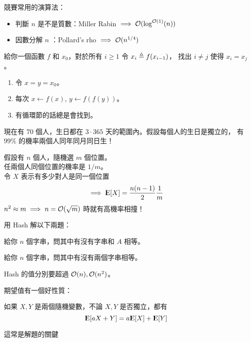 \documentclass[standalone]{beamer}
\begin{document}
\begin{frame}
  競賽常用的演算法：\pause
  \begin{itemize}
    \item 判斷 $n$ 是不是質數：Miller Rabin $ \implies \mathcal{O}(\log^{\mathcal{O}(1)}(n))$
    \item 因數分解 $n$ ：Pollard's rho $ \implies \mathcal{O}(n^{1/4})$
  \end{itemize}
\end{frame}

\begin{frame}{}
  \begin{problem}[找循環節]
    給你一個函數 $f$ 和 $x_0$，對於所有 $i \geq 1$ 令 $x_i \triangleq f(x_{i-1})$，
    找出 $i \neq j$ 使得 $x_i = x_j$。
  \end{problem}
  \pause

  \begin{enumerate}[<+->]
    \item 令 $x = y = x_0$。
    \item 每次 $x \gets f(x)$, $y \gets f(f(y))$。
    \item 有循環節的話總是會找到。
  \end{enumerate}
\end{frame}

\begin{frame}{}
  現在有 $70$ 個人，生日都在 $3 \cdot 365$ 天的範圍內。假設每個人的生日是獨立的，
  有 $99\%$ 的機率兩個人同年同月同日生！ \pause

  假設有 $n$ 個人，隨機選 $m$ 個位置。\\ \pause
  任兩個人同個位置的機率是 $1 / m$。 \\ \pause
  令 $X$ 表示有多少對人是同一個位置
  \[ \implies {\rm I\kern-.3em E}[X] = \frac{n(n-1)}{2} \frac{1}{m} \]
  \pause
  $n^2 \approx m \implies n = \mathcal{O}(\sqrt{m})$ 時就有高機率相撞！
\end{frame}

\begin{frame}{}
  用 Hash 解以下兩題：
  \begin{problem}
    給你 $n$ 個字串，問其中有沒有字串和 $A$ 相等。
  \end{problem}
  \pause
  \begin{problem}
    給你 $n$ 個字串，問其中有沒有兩個字串相等。
  \end{problem}
  \pause
  Hash 的值分別要超過 $\mathcal{O}(n), \mathcal{O}(n^2)$。
\end{frame}

\begin{frame}{}
  期望值有一個好性質：
  \begin{theorem} 如果 $X, Y$ 是兩個隨機變數，\alert<1>{不論 $X, Y$ 是否獨立}，都有
  \[
    {\rm I\kern-.3em E}[aX + Y] = a{\rm I\kern-.3em E}[X] + {\rm I\kern-.3em E}[Y] \label{eq:expect_linear}
  \]
  \pause
  \end{theorem}
  這常是解題的關鍵
\end{frame}
\end{document}
